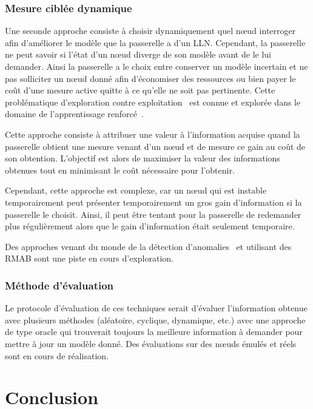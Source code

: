 \subsubsection{Mesure ciblée dynamique}

Une seconde approche consiste à choisir dynamiquement quel nœud interroger afin d'améliorer le modèle que la passerelle a d'un \ac{LLN}.
Cependant, la passerelle ne peut savoir si l'état d'un nœud diverge de son modèle avant de le lui demander.
Ainsi la passerelle a le choix entre conserver un modèle incertain et ne pas solliciter un nœud donné afin d'économiser des ressources ou bien payer le coût d'une mesure active quitte à ce qu'elle ne soit pas pertinente.
Cette problématique d'exploration contre exploitation~\cite{liu1112intrusion} est connue et explorée dans le domaine de l'apprentissage renforcé~\cite{posen2012chasing}.

Cette approche consiste à attribuer une valeur à l'information acquise quand la passerelle obtient une mesure venant d'un nœud et de mesure ce gain au coût de son obtention.
L'objectif est alors de maximiser la valeur des informations obtenues tout en minimisant le coût nécessaire pour l'obtenir.

Cependant, cette approche est complexe, car un nœud qui est instable temporairement peut présenter temporairement un gros gain d'information si la passerelle le choisit.
Ainsi, il peut être tentant pour la passerelle de redemander plus régulièrement alors que le gain d'information était seulement temporaire.

Des approches venant du monde de la détection d'anomalies~\cite{liu1112intrusion} et utilisant des \ac{RMAB} sont une piste en cours d'exploration.

\subsubsection{Méthode d'évaluation}

Le protocole d'évaluation de ces techniques serait d'évaluer l'information obtenue avec plusieurs méthodes (aléatoire, cyclique, dynamique, etc.) avec une approche de type oracle qui trouverait toujours la meilleure information à demander pour mettre à jour un modèle donné.
Des évaluations sur des nœuds émulés et réels sont en cours de réalisation.

\section{Conclusion}
\label{supervision:conclusion}

